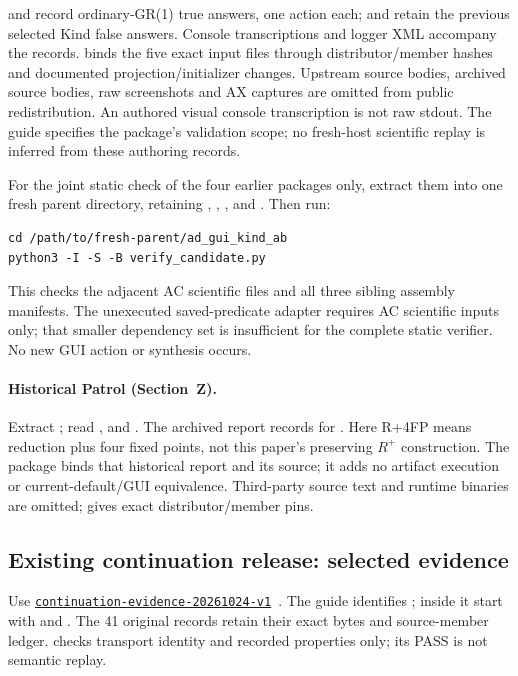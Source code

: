  and  record ordinary-GR(1)
true answers, one action each;  and
 retain the previous selected Kind false
answers. Console transcriptions and logger XML accompany the records.
 binds the five exact input files through
distributor/member hashes and documented projection/initializer changes.
Upstream source bodies, archived source bodies, raw screenshots and AX
captures are omitted from public redistribution. An authored visual
console transcription is not raw stdout. The guide specifies the
package's validation scope; no fresh-host scientific replay is inferred
from these authoring records.

For the joint static check of the four earlier packages only, extract them
into one fresh parent directory, retaining , ,
, and . Then run:
\begin{verbatim}
cd /path/to/fresh-parent/ad_gui_kind_ab
python3 -I -S -B verify_candidate.py
\end{verbatim}
This checks the adjacent AC scientific files and all three sibling
assembly manifests. The unexecuted saved-predicate adapter requires AC
scientific inputs only; that smaller dependency set is insufficient for
the complete static verifier. No new GUI action or synthesis occurs.

\paragraph{Historical Patrol (Section~Z).}
Extract ; read ,
 and
. The archived report records
 for .
Here R+4FP means reduction plus four fixed points, not this paper's
preserving $R^+$ construction. The package binds that historical report
and its source; it adds no artifact execution or current-default/GUI
equivalence. Third-party source text and runtime binaries are omitted;
 gives exact distributor/member pins.

\subsection*{Existing continuation release: selected evidence}
Use \href{https://github.com/research-artifact-archive/seams2027/blob/continuation-evidence-20261024-v1/CONTINUATION_EVIDENCE.md}{\nolinkurl{continuation-evidence-20261024-v1}}~\cite{continuationartifact}.
The guide identifies ;
inside it start with  and
. The 41 original records retain their exact
bytes and source-member ledger.  checks transport
identity and recorded properties only; its PASS is not semantic replay.

